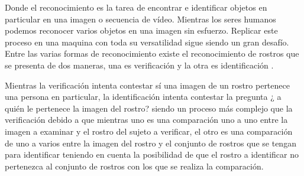 Donde el reconocimiento es la tarea de encontrar e identificar objetos en particular en una imagen o secuencia de vídeo. Mientras los seres humanos podemos reconocer varios objetos en una imagen sin esfuerzo. Replicar este proceso en una maquina con toda su versatilidad sigue siendo un gran desafío.
Entre las varias formas de reconocimiento existe el reconocimiento de rostros que se presenta de dos maneras, una es verificación y la otra es identificación \cite{alice2003biometric}.

Mientras la verificación intenta contestar sí una imagen de un rostro pertenece una persona en particular, la identificación intenta contestar la pregunta ¿ a quién le pertenece la imagen del rostro? siendo un proceso más complejo que la verificación debido a que mientras uno es una comparación uno a uno entre la imagen a examinar y el rostro del sujeto a verificar, el otro es una comparación de uno a varios entre la imagen del rostro y el conjunto de rostros que se tengan para identificar teniendo en cuenta la posibilidad de que el rostro a identificar no pertenezca al conjunto de rostros con los que se realiza la comparación.

